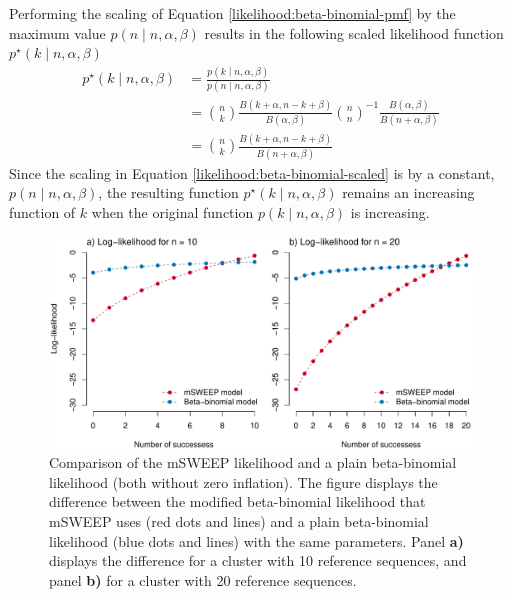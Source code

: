 \documentclass[officiallayout]{tktla}
\begin{document}
Performing the scaling of Equation \eqref{likelihood:beta-binomial-pmf}
by the maximum value $p\left(n \middle| n, \alpha, \beta\right)$
results in the following scaled likelihood function $p^{\star}\left(k
\middle| n, \alpha, \beta\right)$
\begin{equation}
  \label{likelihood:beta-binomial-scaled}
  \begin{aligned}
    p^{\star}\left(k \middle| n, \alpha, \beta\right) &= \frac{p\left(k \middle| n, \alpha, \beta\right)}{p\left(n \middle| n, \alpha, \beta\right)} \\
    &= \binom{n}{k}\frac{B\left(k + \alpha, n - k + \beta\right)}{B\left(\alpha, \beta\right)} \binom{n}{n}^{-1}\frac{B\left(\alpha, \beta\right)}{B\left(n + \alpha, \beta\right)} \\
    &= \binom{n}{k}\frac{B\left(k + \alpha, n - k + \beta\right)}{B\left(n + \alpha, \beta\right)}
  \end{aligned}
\end{equation}
Since the scaling in Equation \eqref{likelihood:beta-binomial-scaled} is
by a constant, $p\left(n \middle| n, \alpha, \beta\right)$, the
resulting function $p^{\star}\left(k \middle| n, \alpha, \beta\right)$
remains an increasing function of $k$ when the original function
$p\left(k \middle| n, \alpha, \beta\right)$ is increasing.

\begin{figure}[!h]
  \label{fig:msweep-vs-beta-binomial}
    \centering
    \includegraphics[width=\textwidth,keepaspectratio]{img/mSWEEP_likelihood.pdf}
    \caption{Comparison of the mSWEEP likelihood and a plain beta-binomial likelihood (both without zero inflation). The figure displays the difference between the modified beta-binomial likelihood that mSWEEP uses (red dots and lines) and a plain beta-binomial likelihood (blue dots and lines) with the same parameters. Panel \textbf{a)} displays the difference for a cluster with 10 reference sequences, and panel \textbf{b)} for a cluster with 20 reference sequences.}
\end{figure}
\end{document}
